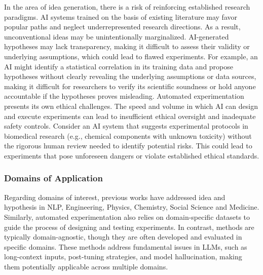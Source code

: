 In the area of idea generation, there is a risk of reinforcing established research paradigms. AI systems trained on the basis of existing literature may favor popular paths and neglect underrepresented research directions. As a result, unconventional ideas may be unintentionally marginalized. %
AI-generated hypotheses may lack transparency, making it difficult to assess their validity or underlying assumptions, which could lead to flawed experiments. For example, an AI might identify a statistical correlation in its training data and propose  hypotheses without clearly revealing the underlying assumptions or data sources, making it difficult for researchers to verify its scientific soundness or hold anyone accountable if the hypotheses proves misleading. 
Automated experimentation presents its own ethical challenges. The speed and volume in which AI can design and execute experiments can lead to insufficient ethical oversight and inadequate safety controls. Consider an AI system that suggests experimental protocols in biomedical research (e.g., chemical components with unknown toxicity) without the rigorous human review needed to identify potential risks. This could lead to experiments that pose unforeseen dangers or violate established ethical standards.

\subsubsection{Domains of Application}
Regarding domains of interest, previous works have addressed idea and hypothesis in NLP, Engineering, Physics, Chemistry, Social Science and Medicine.  Similarly, automated experimentation also relies on domain-specific datasets to guide the process of designing and testing experiments. In contrast, methods are typically domain-agnostic, though they are often developed and evaluated in specific domains. These methods address fundamental issues in LLMs, such as long-context inputs, post-tuning strategies, and model hallucination, making them potentially applicable across multiple domains. 

